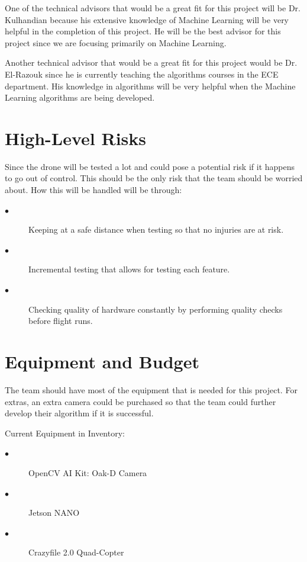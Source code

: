 \documentclass[12pt,onecolumn]{IEEEtran}			%
\begin{document}
One of the technical advisors that would be a great fit for this project will be Dr. Kulhandian because his extensive knowledge of Machine Learning will be very helpful in the completion of this project. He will be the best advisor for this project since we are focusing primarily on Machine Learning.

Another technical advisor that would be a great fit for this project would be Dr. El-Razouk since he is currently teaching the algorithms courses in the ECE department. His knowledge in algorithms will be very helpful when the Machine Learning algorithms are being developed. 



\section{High-Level Risks}
Since the drone will be tested a lot and could pose a potential risk if it happens to go out of control. This should be the only risk that the team should be worried about. How this will be handled will be through: 
\vspace{12pt} 
 \begin{description}
  \item[$\bullet$ ] Keeping at a safe distance when testing so that no injuries are at risk. 
  \item[$\bullet$ ] Incremental testing that allows for testing each feature. 
  \item[$\bullet$ ] Checking quality of hardware constantly by performing quality checks before flight runs. 
\end{description}



\section{Equipment and Budget}
The team should have most of the equipment that is needed for this project. For extras, an extra camera could be purchased so that the team could further develop their algorithm if it is successful. 
\vspace{12pt} 

Current Equipment in Inventory: 
 \begin{description}
  \item[$\bullet$ ] OpenCV AI Kit: Oak-D Camera
  \item[$\bullet$ ] Jetson NANO
  \item[$\bullet$ ] Crazyfile 2.0 Quad-Copter
\end{description}
\end{document}
